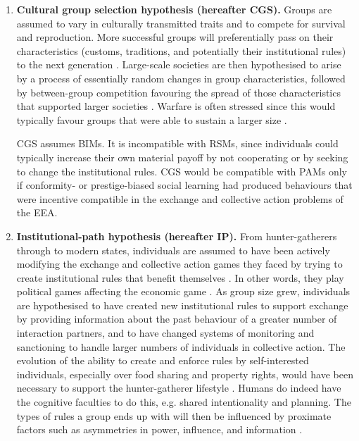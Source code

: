 \documentclass[10pt, a4paper, fleqn]{article}
\begin{document}
 \renewcommand{\labelenumi}{(\arabic{enumi})}
 \begin{enumerate}
\item \textbf{Cultural group selection hypothesis (hereafter CGS).} Groups are assumed to vary in culturally transmitted traits and to compete for survival and reproduction. More successful groups will preferentially pass on their characteristics (customs, traditions, and potentially their institutional rules) to the next generation \citep{Richerson:2016:a, Turchin:2010:a,Turchin:2015:b}. Large-scale societies are then hypothesised to arise by a process of essentially random changes in group characteristics, followed by between-group competition favouring the spread of those characteristics that supported larger societies \citep{Henrich:2016:b}. Warfare is often stressed since this would typically favour groups that were able to sustain a larger size \citep{Turchin:2013:a,Turchin:2015:b}. 

CGS assumes BIMs. It is incompatible with RSMs, since individuals could typically increase their own material payoff by not cooperating or by seeking to change the institutional rules. CGS would be compatible with PAMs only if conformity- or prestige-biased social learning had produced behaviours that were incentive compatible in the exchange and collective action problems of the EEA. 

\item \textbf{Institutional-path hypothesis (hereafter IP).} From hunter-gatherers through to modern states, individuals are assumed to have been actively modifying the exchange and collective action games they faced by trying to create institutional rules that benefit themselves \citep{North:1990:a,Powers:2016:a,Powers:2017:a}. In other words, they play political games affecting the economic game \citep{Hurwicz:1996:a,Ober:2008:a}.  As group size grew, individuals are hypothesised to have created new institutional rules to support exchange by providing information about the past behaviour of a greater number of interaction partners, and to have changed systems of monitoring and sanctioning to handle larger numbers of individuals in collective action. The evolution of the ability to create and enforce rules by self-interested individuals, especially over food sharing and property rights, would have been necessary to support the hunter-gatherer lifestyle \citep{Powers:2016:a}. Humans do indeed have the cognitive faculties to do this, e.g. shared intentionality \citep{Tomasello:2007:a} and planning. The types of rules a group ends up with will then be influenced by proximate factors such as asymmetries in power, influence, and information \citep{Singh:2017:a}.


\end{enumerate}
\end{document}
